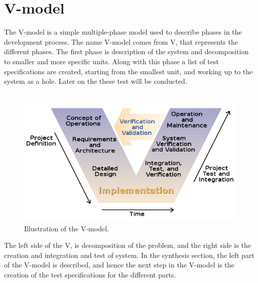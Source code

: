 \section{V-model}

%
%
%
%
%
%
%
%
%
%
%
%
%
%
%

The V-model is a simple multiple-phase model used to describe phases in the development process. 
The name V-model comes from V, that represents the different phases.
The first phase is description of the system and decomposition to smaller and more specific units.
Along with this phase a list of test specifications are created, starting from the smallest unit, and working up to the system as a hole.
Later on the these test will be conducted.
\\\\
\begin{figure}
\centering
\includegraphics[scale=0.5]{figures/20170215_V-model_image.png}
\caption{Illustration of the V-model. \cite{V-modelwiki}} 
\end{figure}
The left side of the V, is decomposition of the problem, and the right side is the creation and integration and test of system.
In the synthesis section, the left part of the V-model is described, and hence the next step in the V-model is the creation of the test specifications for the different parts.


